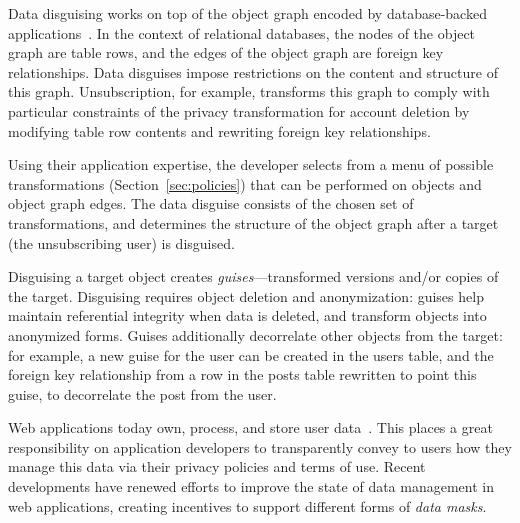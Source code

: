 Data disguising works on top of the object graph encoded by database-backed
applications~\cite{orm}. In the context of relational databases, the nodes of the object graph are
table rows, and the edges of the object graph are foreign key relationships. Data disguises impose
restrictions on the content and structure of this graph. Unsubscription, for example, transforms
this graph to comply with particular constraints of the privacy transformation for account deletion
by modifying table row contents and rewriting foreign key relationships.

Using their application expertise, the developer selects from a menu of possible transformations
(Section~\ref{sec:policies}) that can be performed on objects and object graph edges. 
The data disguise consists of the chosen set of transformations, and determines the
structure of the object graph after a target (\eg the unsubscribing user) is disguised.

Disguising a target object creates \emph{guises}---transformed versions and/or copies of the target.
Disguising requires object deletion and anonymization: guises help maintain referential integrity
when data is deleted, and transform objects into anonymized forms.  Guises additionally decorrelate
other objects from the target: for example, a new guise for the user can be created in the users
table, and the foreign key relationship from a row in the posts table rewritten to point this guise,
to decorrelate the post from the user.




\iffalse
Web applications today own, process, and store user data~\cite{nytimes:fb, npr:data}. This places a
great responsibility on application developers to transparently convey to users how they manage this
data via their privacy policies and terms of use.
%
Recent developments have renewed efforts to improve the state of data management in web
applications, creating incentives to support different forms of \emph{data masks}.

